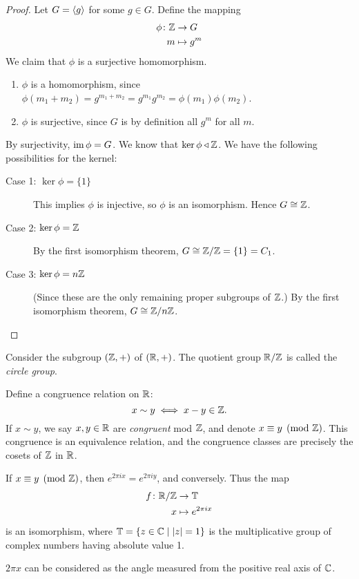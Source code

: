 \begin{proof}
Let $G=\left\langle g\right\rangle$ for some $g\in G$. Define the mapping
\begin{align*}
\phi\colon\mathbb Z&\to G\\
m&\mapsto g^m
\end{align*}
We claim that $\phi$ is a surjective homomorphism.
\begin{enumerate}
\item $\phi$ is a homomorphism, since $\phi(m_1+m_2)=g^{m_1+m_2}=g^{m_1}g^{m_2}=\phi(m_1)\phi(m_2)$.
\item $\phi$ is surjective, since $G$ is by definition all $g^m$ for all $m$.
\end{enumerate}

By surjectivity, $\operatorname{im}\phi=G$.
We know that $\ker\phi\triangleleft\mathbb Z$. 
We have the following possibilities for the kernel:
\begin{description}
\item[Case 1: $\ker\phi=\{1\}$] This implies $\phi$ is injective, so $\phi$ is an isomorphism. Hence $G\cong\mathbb Z$.
\item[Case 2: $\ker\phi=\mathbb Z$] By the first isomorphism theorem, $G\cong\mathbb Z/\mathbb Z=\{1\}=C_1$.
\item[Case 3: $\ker\phi=n\mathbb Z$] (Since these are the only remaining proper subgroups of $\mathbb Z$.) By the first isomorphism theorem, $G\cong\mathbb Z/n\mathbb Z$.
\end{description}
\end{proof}

\begin{example}
Consider the subgroup $(\mathbb Z,+)$ of $(\mathbb R,+)$. 
The quotient group $\mathbb R/\mathbb Z$ is called the \emph{circle group}.

Define a congruence relation on $\mathbb R$:
\[x\sim y\iff x-y\in\mathbb Z.\]
If $x\sim y$, we say $x,y\in\mathbb R$ are \emph{congruent} mod $\mathbb Z$, and denote $x\equiv y\pmod{\mathbb Z}$. This congruence is an equivalence relation, and the congruence classes are precisely the cosets of $\mathbb Z$ in $\mathbb R$.

If $x\equiv y\pmod{\mathbb Z}$, then $e^{2\pi ix}=e^{2\pi iy}$, and conversely.
Thus the map
\begin{align*}
f\colon\mathbb R/\mathbb Z&\to\mathbb T\\
x&\mapsto e^{2\pi ix}
\end{align*}
is an isomorphism, where $\mathbb T=\{z\in\mathbb C\mid|z|=1\}$ is the multiplicative group of complex numbers having absolute value 1.

\begin{remark}
$2\pi x$ can be considered as the angle measured from the positive real axis of $\mathbb C$.
\end{remark}
\end{example}

